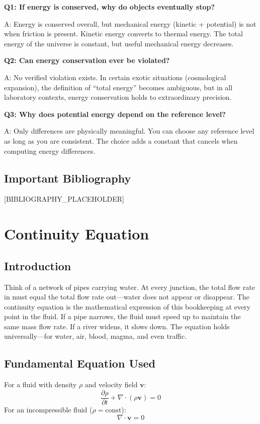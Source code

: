 \documentclass[11pt,openright]{book}
\begin{document}
\textbf{Q1: If energy is conserved, why do objects eventually stop?}

A: Energy is conserved overall, but mechanical energy (kinetic + potential) is not when friction is present. Kinetic energy converts to thermal energy. The total energy of the universe is constant, but useful mechanical energy decreases.

\textbf{Q2: Can energy conservation ever be violated?}

A: No verified violation exists. In certain exotic situations (cosmological expansion), the definition of ``total energy'' becomes ambiguous, but in all laboratory contexts, energy conservation holds to extraordinary precision.

\textbf{Q3: Why does potential energy depend on the reference level?}

A: Only differences are physically meaningful. You can choose any reference level as long as you are consistent. The choice adds a constant that cancels when computing energy differences.
\section*{Important Bibliography}

[BIBLIOGRAPHY_PLACEHOLDER]


\chapter{Continuity Equation}

\section*{Introduction}

Think of a network of pipes carrying water. At every junction, the total flow rate in must equal the total flow rate out---water does not appear or disappear. The continuity equation is the mathematical expression of this bookkeeping at every point in the fluid. If a pipe narrows, the fluid must speed up to maintain the same mass flow rate. If a river widens, it slows down. The equation holds universally---for water, air, blood, magma, and even traffic.
\section*{Fundamental Equation Used}

For a fluid with density $\rho$ and velocity field $\mathbf{v}$:
\[
\frac{\partial \rho}{\partial t} + \nabla \cdot (\rho \mathbf{v}) = 0
\]
For an incompressible fluid ($\rho = \text{const}$):
\[
\nabla \cdot \mathbf{v} = 0
\]
\end{document}
